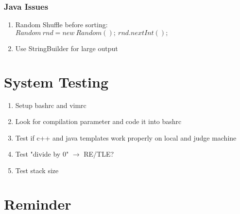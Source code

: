 \documentclass[10pt,oneside]{article}
\begin{document}
\begin{landscape}
\begin{multicols}{2}
\subsubsection{Java Issues}
\begin{enumerate}
	\item Random Shuffle before sorting: $Random\ rnd = new\ Random();\ rnd.nextInt();$
	\item Use StringBuilder for large output
\end{enumerate}

\section{System Testing}

\begin{enumerate}
	\item Setup bashrc and vimrc
	\item Look for compilation parameter and code it into bashrc
	\item Test if c++ and java templates work properly on local and judge machine
	\item Test "divide by 0" $\rightarrow$ RE/TLE?
	\item Test stack size
\end{enumerate}


\section{Reminder}


\end{multicols}
\end{landscape}
\end{document}
